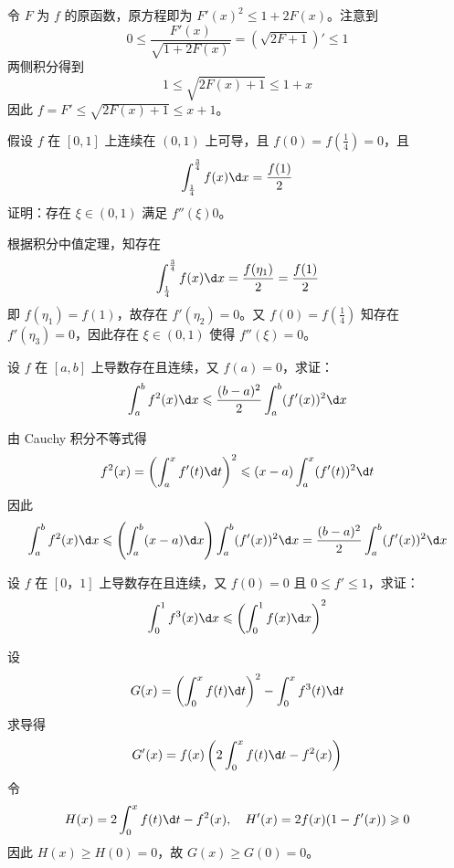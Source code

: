 \begin{solution}
	令 $F$ 为 $f$ 的原函数，原方程即为 $F'(x)^2 \leqslant 1 + 2F(x)$。注意到
	\[ 0 \leqslant \frac{F'(x)}{\sqrt{1 + 2 F(x)}} = \left(\sqrt{2F+1}\right)' \leqslant 1 \]
	两侧积分得到
	\[ 1 \leqslant \sqrt{2F(x) + 1}  \leqslant 1 + x \]
	因此 $f = F' \leqslant \sqrt{2F(x) + 1} \leqslant x + 1$。
\end{solution}

\begin{problem}[000055]
假设 $f$ 在 $[0, 1]$ 上连续在 $(0, 1)$ 上可导，且 $f(0) = f(\frac{1}{4}) = 0$，且
\[ \int_{\frac{1}{4}}^{\frac{3}{4}} f(x) \d x = \frac{f(1)}{2} \]
证明：存在 $\xi \in (0, 1)$ 满足 $f''(\xi)  0$。
\end{problem}

\begin{solution}
	根据积分中值定理，知存在
	\[ \int_{\frac{1}{4}}^{\frac{3}{4}} f(x) \d x = \frac{f(\eta_1)}{2} = \frac{f(1)}{2} \]
	即 $f(\eta_1) = f(1)$，故存在 $f'(\eta_2) = 0$。又 $f(0) = f(\frac{1}{4})$ 知存在 $f'(\eta_3) = 0$，因此存在 $\xi \in (0, 1)$ 使得 $f''(\xi) = 0$。
\end{solution}

\begin{problem}[000056]
设 $f$ 在 $[a, b]$ 上导数存在且连续，又 $f(a) = 0$，求证：
\[ \int_{a}^{b} f^2(x) \d x \leqslant \frac{(b-a)^2}{2} \int_{a}^{b} (f'(x))^2 \d x \]
\end{problem}

\begin{solution}
	由 Cauchy 积分不等式得
	\[
		f^2(x)  = \left(\int_{a}^{x} f'(t) \d t\right)^2
		\leqslant (x-a) \int_{a}^{x} (f'(t))^2 \d t
	\]
	因此
	\[ \int_{a}^{b} f^2(x) \d x \leqslant \left(\int_{a}^{b} (x-a) \d x \right) \int_{a}^{b} (f'(x))^2 \d x = \frac{(b-a)^2}{2} \int_{a}^{b} (f'(x))^2 \d x \]
\end{solution}

\begin{problem}[000057]
设 $f$ 在 $[0， 1]$ 上导数存在且连续，又 $f(0) = 0$ 且 $0 \leqslant f' \leqslant 1$，求证：
\[ \int_{0}^{1} f^3(x) \d x \leqslant \left(\int_{0}^{1} f(x) \d x\right)^2 \]
\end{problem}

\begin{solution}
	设
	\[ G(x) =  \left(\int_{0}^{x} f(t) \d t\right)^2 - \int_{0}^{x} f^3(t) \d t \]
	求导得
	\[ G'(x) = f(x) \left(2 \int_{0}^{x} f(t) \d t - f^2(x)\right) \]
	令
	\[ H(x) = 2 \int_{0}^{x} f(t) \d t - f^2(x), \quad H'(x) = 2f(x)(1 - f'(x)) \geqslant 0 \]
	因此 $H(x) \geqslant H(0) = 0$，故 $G(x) \geqslant G(0) = 0$。
\end{solution}

